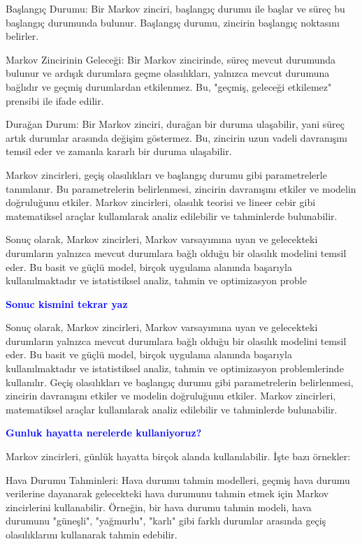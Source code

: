\documentclass[11pt]{article}
\begin{document}
Başlangıç Durumu: Bir Markov zinciri, başlangıç durumu ile başlar ve süreç bu başlangıç durumunda bulunur. Başlangıç durumu, zincirin başlangıç noktasını belirler.

Markov Zincirinin Geleceği: Bir Markov zincirinde, süreç mevcut durumunda bulunur ve ardışık durumlara geçme olasılıkları, yalnızca mevcut durumuna bağlıdır ve geçmiş durumlardan etkilenmez. Bu, "geçmiş, geleceği etkilemez" prensibi ile ifade edilir.

Durağan Durum: Bir Markov zinciri, durağan bir duruma ulaşabilir, yani süreç artık durumlar arasında değişim göstermez. Bu, zincirin uzun vadeli davranışını temsil eder ve zamanla kararlı bir duruma ulaşabilir.

Markov zincirleri, geçiş olasılıkları ve başlangıç durumu gibi parametrelerle tanımlanır. Bu parametrelerin belirlenmesi, zincirin davranışını etkiler ve modelin doğruluğunu etkiler. Markov zincirleri, olasılık teorisi ve lineer cebir gibi matematiksel araçlar kullanılarak analiz edilebilir ve tahminlerde bulunabilir.

Sonuç olarak, Markov zincirleri, Markov varsayımına uyan ve gelecekteki durumların yalnızca mevcut durumlara bağlı olduğu bir olasılık modelini temsil eder. Bu basit ve güçlü model, birçok uygulama alanında başarıyla kullanılmaktadır ve istatistiksel analiz, tahmin ve optimizasyon proble

\textbf{\textcolor{blue}{Sonuc kismini tekrar yaz}}

Sonuç olarak, Markov zincirleri, Markov varsayımına uyan ve gelecekteki durumların yalnızca mevcut durumlara bağlı olduğu bir olasılık modelini temsil eder. Bu basit ve güçlü model, birçok uygulama alanında başarıyla kullanılmaktadır ve istatistiksel analiz, tahmin ve optimizasyon problemlerinde kullanılır. Geçiş olasılıkları ve başlangıç durumu gibi parametrelerin belirlenmesi, zincirin davranışını etkiler ve modelin doğruluğunu etkiler. Markov zincirleri, matematiksel araçlar kullanılarak analiz edilebilir ve tahminlerde bulunabilir.

\textbf{\textcolor{blue}{Gunluk hayatta nerelerde kullaniyoruz?}}

Markov zincirleri, günlük hayatta birçok alanda kullanılabilir. İşte bazı örnekler:

Hava Durumu Tahminleri: Hava durumu tahmin modelleri, geçmiş hava durumu verilerine dayanarak gelecekteki hava durumunu tahmin etmek için Markov zincirlerini kullanabilir. Örneğin, bir hava durumu tahmin modeli, hava durumunu "güneşli", "yağmurlu", "karlı" gibi farklı durumlar arasında geçiş olasılıklarını kullanarak tahmin edebilir.
\end{document}
